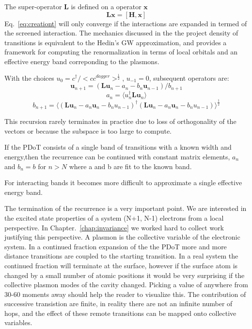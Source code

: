 \documentclass{article}
\def\ket{\rangle}
\def\bra{\langle}
\begin{document}
The super-operator $\mathbf{L}$ is defined on a operator $\mathbf{x}$
%
\begin{equation}
\mathbf{L} \mathbf{x} = [\mathbf{H}, \mathbf{x}]
\end{equation}
%
Eq.~\ref{eq:creationt} will only converge if the interactions are expanded in termed
of the screened interaction. The mechanics discussed in the the project density of 
transitions is equivalent to the Hedin's GW approximation, and provides a framework
for computing the renormalization in terms of local orbitals and an 
effective energy band correponding to the plasmons.

With the choices $u_{0}=c^{\dagger}/<c c^{dagger}>^{\frac{1}{2}}$, $u_{-1}=0$,
subsequent operators are:
%
\begin{equation}
\label{eq:pdotvectors}
\mathbf{u}_{n+1} = (\mathbf{L} \mathbf{u}_{n} - a_{n}-b_{n}\mathbf{u}_{n-1})/b_{n+1}
\end{equation}
%
\begin{equation}
a_{n} = \bra u^{\dagger}_{n} \mathbf{L} \mathbf{u}_{n} \ket
\end{equation}
%
\begin{equation}
b_{n+1} = \bra 
(\mathbf{L} \mathbf{u}_{n} - a_{n} \mathbf{u}_{n} - b_{n}u_{n-1})^{\dagger} 
(\mathbf{L} \mathbf{u}_{n} - a_{n} \mathbf{u}_{n} - b_{n}u_{n-1})
\ket^{\frac{1}{2}}
\end{equation}
%

This recursion rarely terminates in practice due to loss of orthogonality of
the vectors or because the subspace is too large to compute.

If the PDoT consists of a single band of transitions with a known width 
and energy,then the recurrence can be continued with constant matrix elements, $a_{n}$ and $b_{n}=b$
for $n>N$ where a and b are fit to the known band. 

For interacting bands it becomes more difficult to approximate a 
single effective energy band.

The termination of the recurrence is a very important point. 
We are interested in the excited state properties of a system (N+1, N-1) electrons
from a local perspective. In Chapter.~\ref{chap:invariance} we worked hard to collect work
justifying this perspective. A plasmon is the collective variable of the electronic system.
In a continued fraction expansion of the the PDoT more and more distance transitions are coupled
to the starting transition. In a real system the continued fraction will terminate at the surface,
however if the surface atom is changed by a small number of atomic positions it would
be very surprising if the collective plasmon modes of the cavity changed. 
Picking a value of anywhere from 30-60 moments away should help the reader to visualize this.
The contribution of successive transistion are finite, in reality there are not an infinite number
of hops, and the effect of these remote transitions can be mapped onto collective variables.
\end{document}
